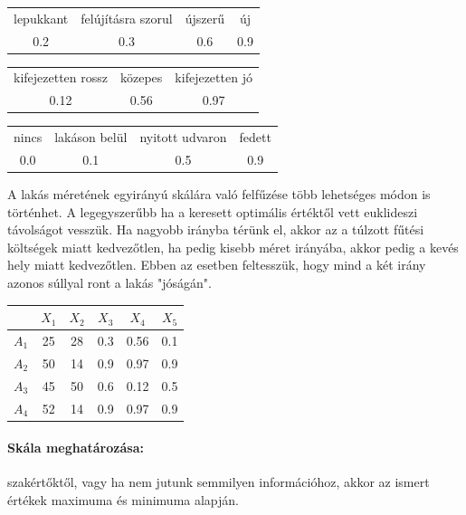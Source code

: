 \documentclass[a4paper,12pt]{article}
\begin{document}
\begin{center}
\begin{tabular}{cccc}
lepukkant& felújításra szorul& újszerű & új \\
0.2 &0.3&0.6&0.9\\
\end{tabular}

\begin{tabular}{ccc}
 kifejezetten rossz& közepes & kifejezetten jó \\
 0.12&0.56&0.97\\
\end{tabular}

\begin{tabular}{cccc}
 nincs & lakáson belül & nyitott udvaron & fedett \\
 0.0 & 0.1 & 0.5 & 0.9 \\
\end{tabular}

\end{center}

A lakás méretének egyirányú skálára való felfűzése több lehetséges módon is történhet. A legegyszerűbb ha a keresett optimális értéktől vett euklideszi távolságot vesszük. Ha nagyobb irányba térünk el, akkor az a túlzott fűtési költségek miatt kedvezőtlen, ha pedig kisebb méret irányába, akkor pedig a kevés hely miatt kedvezőtlen. Ebben az esetben feltesszük, hogy mind a két irány azonos súllyal ront a lakás "jóságán".

\begin{center}
\begin{tabular}{c||c|c|c|c|c}
 & $X_1$& $X_2$& $X_3$& $X_4$& $X_5$ \\
 \hline
 $A_1$&25  &28 & 0.3 & 0.56 & 0.1 \\
 $A_2$&50  &14 & 0.9 & 0.97& 0.9 \\
 $A_3$&45  &50 & 0.6 & 0.12& 0.5 \\
 $A_4$&52  &14 & 0.9 & 0.97& 0.9 \\

\end{tabular}
\end{center}

\paragraph{Skála meghatározása:} szakértőktől, vagy ha nem jutunk semmilyen információhoz, akkor az ismert értékek maximuma és minimuma alapján.
\end{document}

